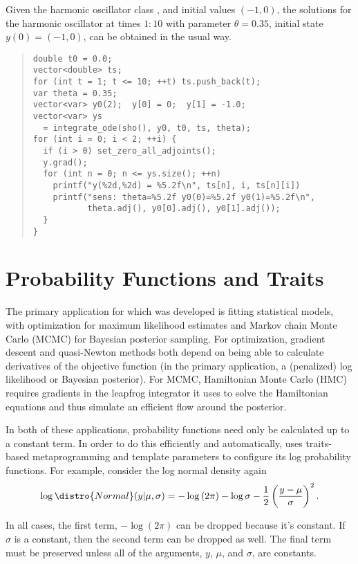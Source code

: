\documentclass[10pt]{article}
\begin{document}
Given the harmonic oscillator class , and initial values
$(-1,0)$, the solutions for the harmonic oscillator at times $1{:}10$
with parameter $\theta = 0.35$, initial state $y(0) = (-1,0)$, can be
obtained in the usual way.
%
\begin{quote}
\begin{Verbatim}
double t0 = 0.0;   
vector<double> ts;  
for (int t = 1; t <= 10; ++t) ts.push_back(t);
var theta = 0.35;
vector<var> y0(2);  y[0] = 0;  y[1] = -1.0;
vector<var> ys 
  = integrate_ode(sho(), y0, t0, ts, theta);
for (int i = 0; i < 2; ++i) {
  if (i > 0) set_zero_all_adjoints();
  y.grad();
  for (int n = 0; n <= ys.size(); ++n) 
    printf("y(%2d,%2d) = %5.2f\n", ts[n], i, ts[n][i])
    printf("sens: theta=%5.2f y0(0)=%5.2f y0(1)=%5.2f\n",
           theta.adj(), y0[0].adj(), y0[1].adj());
  }
}
\end{Verbatim}
\end{quote}





\section{Probability Functions and Traits}\label{probability-functions.section}\label{traits.section}

The primary application for which  was developed is
fitting statistical models, with optimization for maximum likelihood
estimates and Markov chain Monte Carlo (MCMC) for Bayesian posterior
sampling.  For optimization, gradient descent and quasi-Newton methods
both depend on being able to calculate derivatives of the objective
function (in the primary application, a (penalized) log likelihood or
Bayesian posterior).  For MCMC, Hamiltonian Monte Carlo (HMC) requires
gradients in the leapfrog integrator it uses to solve the Hamiltonian
equations and thus simulate an efficient flow around the posterior.

In both of these applications, probability functions need only be
calculated up to a constant term.  In order to do this efficiently and
automatically,  uses traits-based metaprogramming
and template parameters to configure its log probability functions.
For example, consider the log normal density again
\[
\log \distro{Normal}(y | \mu, \sigma)
= -\log \left( 2 \pi \right)
  - \log \sigma
  - \frac{1}{2} \left( \frac{y - \mu}{\sigma} \right)^2.
\]
%

In all cases, the first term, $-\log \left( 2 \pi \right)$ can be
dropped because it's constant.  If $\sigma$ is a constant, then the
second term can be dropped as well.  The final term must be preserved
unless all of the arguments, $y$, $\mu$, and $\sigma$, are constants.  
\end{document}

